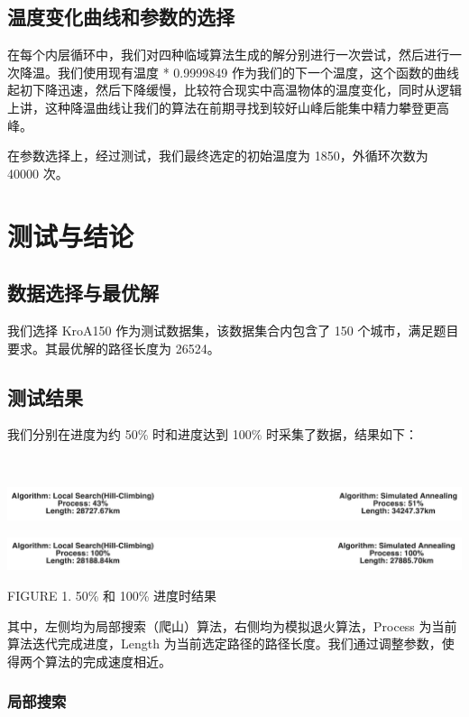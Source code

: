 \documentclass[12pt]{article}%
\begin{document}
\subsection{温度变化曲线和参数的选择}

在每个内层循环中，我们对四种临域算法生成的解分别进行一次尝试，然后进行一次降温。我们使用现有温度 * 0.9999849 作为我们的下一个温度，这个函数的曲线起初下降迅速，然后下降缓慢，比较符合现实中高温物体的温度变化，同时从逻辑上讲，这种降温曲线让我们的算法在前期寻找到较好山峰后能集中精力攀登更高峰。

在参数选择上，经过测试，我们最终选定的初始温度为 1850，外循环次数为 40000 次。

\section{测试与结论}

\subsection{数据选择与最优解}

我们选择 KroA150 作为测试数据集，该数据集合内包含了 150 个城市，满足题目要求。其最优解的路径长度为 26524\cite{besttsp}。

\subsection{测试结果}

我们分别在进度为约 50\% 时和进度达到 100\% 时采集了数据，结果如下：

\ 

\includegraphics[width=\textwidth]{mid.png}

\includegraphics[width=\textwidth]{final.png}
\begin{center}
    FIGURE 1. 50\% 和 100\% 进度时结果
\end{center}

其中，左侧均为局部搜索（爬山）算法，右侧均为模拟退火算法，Process 为当前算法迭代完成进度，Length 为当前选定路径的路径长度。我们通过调整参数，使得两个算法的完成速度相近。

\subsubsection{局部搜索}
\end{document}
